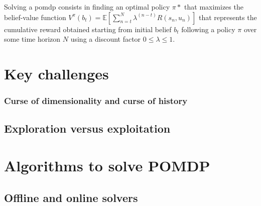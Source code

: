 Solving a \gls{pomdp} consists in finding an optimal policy $\pi*$ that maximizes the belief-value function $V^\pi(b_t) = \mathbb{E}[\sum_{n=t}^{N}\lambda^{(n-t)}R(s_n,u_n)]$ that represents the cumulative reward obtained starting from initial belief $b_t$ following a policy $\pi$ over some time horizon $N$ using a discount factor $0 \leq \lambda \leq 1$.


\section{Key challenges}
\subsubsection{Curse of dimensionality and curse of history}
\subsection{Exploration versus exploitation}


\section{Algorithms to solve POMDP}

\subsection{Offline and online solvers}




